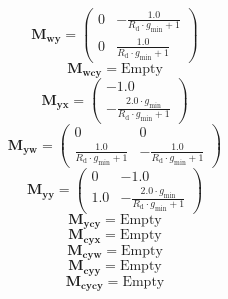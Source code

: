 \documentclass[11pt, oneside]{article}      %
\begin{document}
%
$$ \mathbf{M_{wy}} = \left(\begin{array}{cc}0 & - \frac{1.0}{R_{\mathrm{d}} \cdot g_{\mathrm{min}} + 1}\\0 & \frac{1.0}{R_{\mathrm{d}} \cdot g_{\mathrm{min}} + 1}\end{array}\right)$$
%
$$ \mathbf{M_{wcy}} = \mathrm{Empty}$$
%
$$ \mathbf{M_{yx}} = \left(\begin{array}{c}-1.0\\- \frac{2.0 \cdot g_{\mathrm{min}}}{R_{\mathrm{d}} \cdot g_{\mathrm{min}} + 1}\end{array}\right)$$
%
$$ \mathbf{M_{yw}} = \left(\begin{array}{cc}0 & 0\\\frac{1.0}{R_{\mathrm{d}} \cdot g_{\mathrm{min}} + 1} & - \frac{1.0}{R_{\mathrm{d}} \cdot g_{\mathrm{min}} + 1}\end{array}\right)$$
%
$$ \mathbf{M_{yy}} = \left(\begin{array}{cc}0 & -1.0\\1.0 & - \frac{2.0 \cdot g_{\mathrm{min}}}{R_{\mathrm{d}} \cdot g_{\mathrm{min}} + 1}\end{array}\right)$$
%
$$ \mathbf{M_{ycy}} = \mathrm{Empty}$$
%
$$ \mathbf{M_{cyx}} = \mathrm{Empty}$$
%
$$ \mathbf{M_{cyw}} = \mathrm{Empty}$$
%
$$ \mathbf{M_{cyy}} = \mathrm{Empty}$$
%
$$ \mathbf{M_{cycy}} = \mathrm{Empty}$$
%
\end{document}
